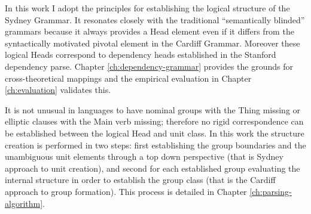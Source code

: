     
    
    
    
    In this work I adopt the principles for establishing the logical structure of the Sydney Grammar. It resonates closely with the traditional ``semantically blinded'' grammars because it always provides a Head element even if it differs from the syntactically motivated pivotal element in the Cardiff Grammar. Moreover these logical Heads correspond to dependency heads established in the Stanford dependency parse. Chapter \ref{ch:dependency-grammar} provides the grounds for cross-theoretical mappings and the empirical evaluation in Chapter \ref{ch:evaluation} validates this.
    
    It is not unusual in languages to have nominal groups with the Thing missing or elliptic clauses with the Main verb missing; therefore no rigid correspondence can be established between the logical Head and unit class. 
    In this work the structure creation is performed in two steps: first establishing the group boundaries and the unambiguous unit elements through a top down perspective (that is Sydney approach to unit creation), and second for each established group evaluating the internal structure in order to establish the group class (that is the Cardiff approach to group formation). This process is detailed in Chapter \ref{ch:parsing-algorithm}.
    
